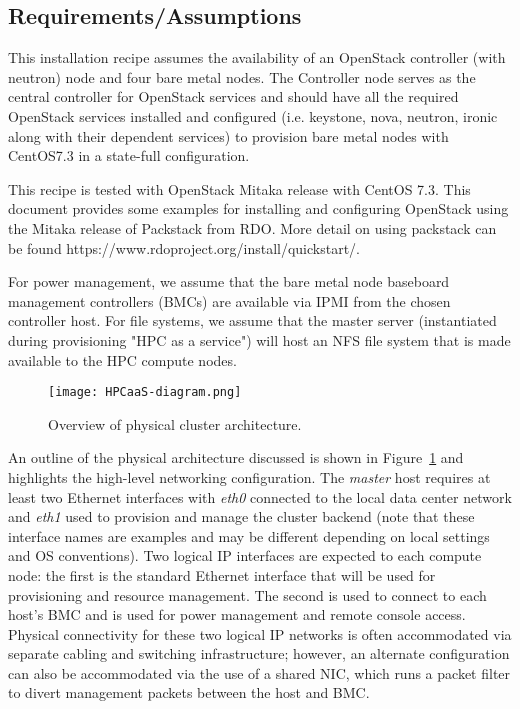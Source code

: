 \subsection{Requirements/Assumptions}

This installation recipe assumes the availability of an OpenStack controller (with neutron) node and four bare metal nodes. The Controller node serves as the central controller for OpenStack services and should have all the required OpenStack services installed and configured (i.e. keystone, nova, neutron, ironic along with their dependent services) to provision bare metal nodes with CentOS7.3 in a state-full 
configuration. 

This recipe is tested with OpenStack Mitaka release with CentOS 7.3. This 
document provides some examples for installing and configuring OpenStack using the Mitaka release of Packstack from RDO. More detail on using packstack can be found https://www.rdoproject.org/install/quickstart/. 

For power management, we assume that the bare metal node baseboard management controllers (BMCs) are available via IPMI from the chosen controller host. For file systems, we assume that the master server (instantiated during provisioning "HPC as a service") will host an NFS file system that is made available to the HPC compute nodes.



\begin{figure}[hbt]
\center
\texttt{[image: HPCaaS-diagram.png]}
\vspace*{-0.2cm}
\caption{Overview of physical cluster architecture.} \label{fig:physical_arch}
\end{figure}
\mbox{}

\vspace*{0.5cm}

An outline of the physical architecture discussed is shown in
Figure~\ref{fig:physical_arch} and highlights the high-level networking
configuration. The {\em master} host requires at least two Ethernet interfaces with {\em eth0} connected to the local data center network and {\em eth1} used to provision and manage the cluster backend (note that these interface names are examples and may be different depending on local settings and OS conventions). Two logical IP interfaces are expected to each compute node: the first is the standard Ethernet interface that will be used for provisioning and resource management. The second is used to connect to each host's BMC and is used for power management and remote console access. Physical connectivity for these two logical IP networks is often accommodated via separate cabling and switching infrastructure; however, an alternate configuration can also be accommodated via the use of a shared NIC, which runs a packet filter to divert management packets between the host and BMC.

